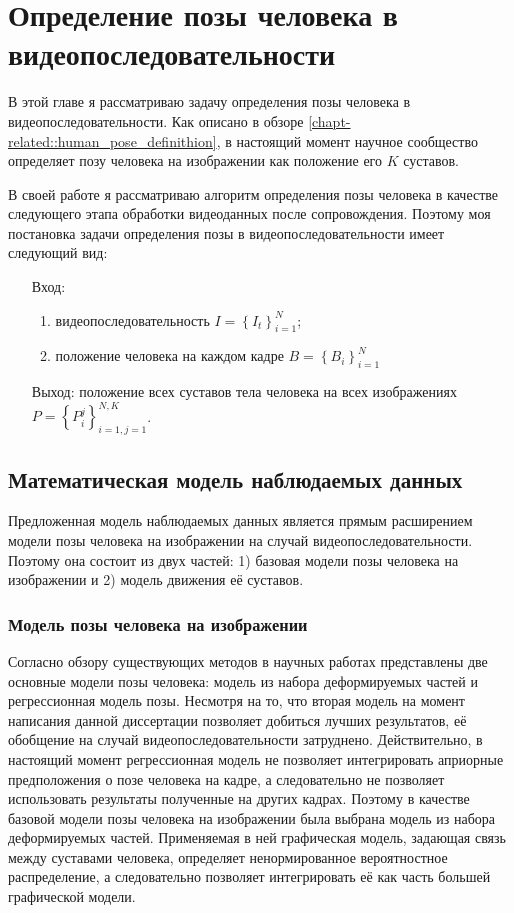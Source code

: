 \chapter{Определение позы человека в видеопоследовательности} \label{chapt6}

В этой главе я рассматриваю задачу определения позы человека в видеопоследовательности. Как описано в обзоре \ref{chapt-related::human_pose_definithion}, в настоящий момент научное сообщество определяет позу человека на изображении как положение его $K$ суставов.

В своей работе я рассматриваю алгоритм определения позы человека в качестве следующего этапа обработки видеоданных после сопровождения. Поэтому моя постановка задачи определения позы в видеопоследовательности имеет следующий вид:
\begin{itemize}
	\item[Вход:] 
	\begin{enumerate}
		\item видеопоследовательность $I=\left\{I_t\right\}_{i=1}^N$;
		\item положение человека на каждом кадре $B=\left\{B_i\right\}_{i=1}^N$
	\end{enumerate}
	\item[Выход:] положение всех суставов тела человека на всех изображениях $P=\left\{P_i^j\right\}_{i=1,j=1}^{N,K}$.
\end{itemize}

\section{Математическая модель наблюдаемых данных}

Предложенная модель наблюдаемых данных является прямым расширением модели позы человека на изображении на случай видеопоследовательности. Поэтому она состоит из двух частей: 1) базовая модели позы человека на изображении и 2) модель движения её суставов.

\subsection{Модель позы человека на изображении}

Согласно обзору существующих методов в научных работах представлены две основные модели позы человека: модель из набора деформируемых частей и регрессионная модель позы. Несмотря на то, что вторая модель на момент написания данной диссертации позволяет добиться лучших результатов, её обобщение на случай видеопоследовательности затруднено. Действительно, в настоящий момент регрессионная модель не позволяет интегрировать априорные предположения о позе человека на кадре, а следовательно не позволяет использовать результаты полученные на других кадрах. Поэтому в качестве базовой модели позы человека на изображении была выбрана модель из набора деформируемых частей. Применяемая в ней графическая модель, задающая связь между суставами человека, определяет ненормированное вероятностное распределение, а следовательно позволяет интегрировать её как часть большей графической модели.

